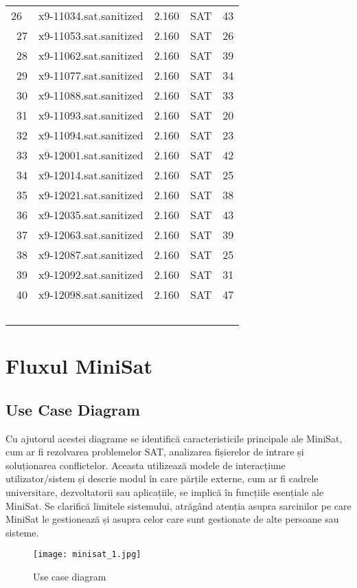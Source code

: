 \documentclass[12pt,a4paper]{report}
\begin{document}
\begin{tabular}{ |p{1cm}||p{4cm}|p{3cm}|p{3cm}|p{3cm}|  }
26 & x9-11034.sat.sanitized &2.160& SAT & 43\\\  
27 & x9-11053.sat.sanitized &2.160& SAT & 26\\\  
28 & x9-11062.sat.sanitized &2.160& SAT & 39\\\  
29 & x9-11077.sat.sanitized &2.160& SAT & 34\\\  
30 & x9-11088.sat.sanitized &2.160& SAT & 33\\\  
31 & x9-11093.sat.sanitized &2.160& SAT & 20\\\  
32 & x9-11094.sat.sanitized &2.160& SAT & 23\\\  
33 & x9-12001.sat.sanitized &2.160& SAT & 42\\\  
34 & x9-12014.sat.sanitized &2.160& SAT & 25\\\  
35 & x9-12021.sat.sanitized &2.160& SAT & 38\\\  
36 & x9-12035.sat.sanitized &2.160& SAT & 43\\\  
37 & x9-12063.sat.sanitized &2.160& SAT & 39\\\  
38 & x9-12087.sat.sanitized &2.160& SAT & 25\\\  
39 & x9-12092.sat.sanitized &2.160& SAT & 31\\\  
40 & x9-12098.sat.sanitized &2.160& SAT & 47\\\
\hline
 
\end{tabular}


\chapter{Fluxul MiniSat}
\section{Use Case Diagram}
Cu ajutorul acestei diagrame se identifică caracteristicile principale ale MiniSat, cum ar fi rezolvarea problemelor SAT, analizarea fișierelor de intrare și soluționarea conflictelor. Aceasta utilizează modele de interacțiune utilizator/sistem și descrie modul în care părțile externe, cum ar fi cadrele universitare, dezvoltatorii sau aplicațiile, se implică în funcțiile esențiale ale MiniSat. Se clarifică limitele sistemului, atrăgând atenția asupra sarcinilor pe care MiniSat le gestionează și asupra celor care sunt gestionate de alte persoane sau sisteme.

\begin{figure}[h]
    \centering
    \texttt{[image: minisat\_1.jpg]}
    \caption{Use case diagram}
    \label{fig:enter-label}
\end{figure}
\\
\end{document}
